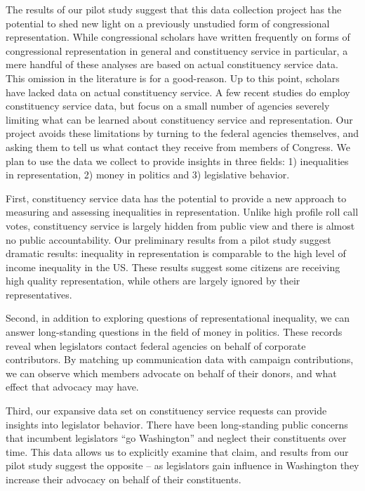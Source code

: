 \documentclass{article}
\begin{document}
The results of our pilot study suggest that this data collection project has the potential to shed new light on a previously unstudied form of congressional representation.  While congressional scholars have written frequently on forms of congressional representation in general and constituency service in particular, a mere handful of these analyses are based on actual constituency service data.  This omission in the literature is for a good-reason. Up to this point, scholars have lacked data on actual constituency service.  A few recent studies do employ constituency service data, but focus on a small number of agencies severely limiting what can be learned about constituency service and representation.  Our project avoids these limitations by turning to the federal agencies themselves, and asking them to tell us what contact they receive from members of Congress. We plan to use the data we collect to provide insights in three fields: 1) inequalities in representation, 2) money in politics and 3) legislative behavior. 

First, constituency service data has the potential to provide a new approach to measuring and assessing inequalities in representation. Unlike high profile roll call votes, constituency service is largely hidden from public view and there is almost no public accountability. Our preliminary results from a pilot study suggest dramatic results: inequality in representation is comparable to the high level of income inequality in the US. These results suggest some citizens are receiving high quality representation, while others are largely ignored by their representatives. 

Second, in addition to exploring questions of representational inequality, we can answer long-standing questions in the field of money in politics. These records reveal when legislators contact federal agencies on behalf of corporate contributors. By matching up communication data with campaign contributions, we can observe which members advocate on behalf of their donors, and what effect that advocacy may have. 

Third, our expansive data set on constituency service requests can provide insights into legislator behavior.  There have been long-standing public concerns that incumbent legislators ``go Washington'' and neglect their constituents over time. This data allows us to explicitly examine that claim, and results from our pilot study suggest the opposite -- as legislators gain influence in Washington they increase their advocacy on behalf of their constituents. 
\end{document}
